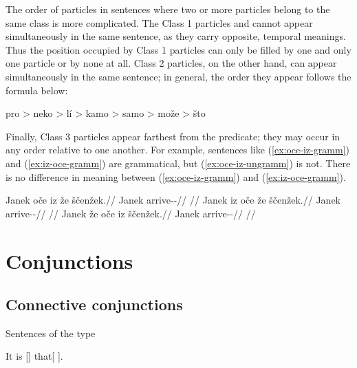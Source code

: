 \pex
\a \ljudge{*} 
\a \ljudge{*} 
\a \ljudge{*} 
\a \ljudge{*} 
\a \ljudge{*} 
\xe

The order of particles in sentences where two or more particles belong to the
same class is more complicated. The Class 1 particles  and 
cannot appear simultaneously in the same sentence, as they carry opposite,
temporal meanings. Thus the position occupied by Class 1 particles can only be
filled by one and only one particle or by none at all. Class 2 particles, on the
other hand, can appear simultaneously in the same sentence; in general, the
order they appear follows the formula below:

\pex
	{pro > neko > lí > kamo > samo > može > što}
\xe

Finally, Class 3 particles appear farthest from the predicate; they may occur in
any order relative to one another. For example, sentences like
(\ref{ex:oce-iz-gramm}) and (\ref{ex:iz-oce-gramm}) are grammatical, but
(\ref{ex:oce-iz-ungramm}) is not. There is no difference in meaning between
(\ref{ex:oce-iz-gramm}) and (\ref{ex:iz-oce-gramm}).

\pex
\a\label{ex:oce-iz-gramm}
\begingl
	\gla Janek oče iz že ščenžek.//
	\glb Janek \Mir{} \Dub{} \Pfv{} arrive-\Av{}-\Pf{}//
	\glft {}//
\endgl
\a\label{ex:iz-oce-gramm}
\begingl
	\gla Janek iz oče že ščenžek.//
	\glb Janek \Dub{} \Mir{} \Pfv{} arrive-\Av{}-\Pf{}//
	\glft {}//
\endgl
\a\label{ex:oce-iz-ungramm}
\begingl
	\gla \ljudge{*}Janek že oče iz ščenžek.//
	\glb Janek \Pfv{} \Mir{} \Dub{} arrive-\Av{}-\Pf{}//
	\glft {}//
\endgl
\xe


\section{Conjunctions}\label{sec:conj}

\subsection{Connective conjunctions}\label{sec:conn-conj}

Sentences of the type

\ex
It is [] that[ ].
\xe

